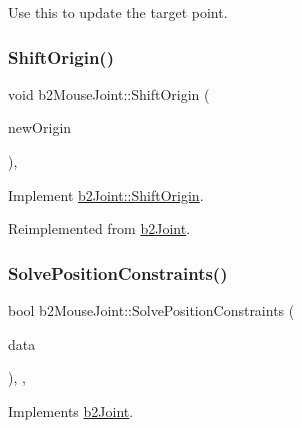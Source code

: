 Use this to update the target point. 

\mbox{\label{classb2_mouse_joint_a9b1b2671837495be175e496afb622904}} 
\subsubsection{\texorpdfstring{ShiftOrigin()}{ShiftOrigin()}}
{\footnotesize\ttfamily void b2\+Mouse\+Joint\+::\+Shift\+Origin (\begin{DoxyParamCaption}\item[{const \mbox{\hyperlink{structb2_vec2}{b2\+Vec2}} \&}]{new\+Origin }\end{DoxyParamCaption})\hspace{0.3cm}{\ttfamily [override]}, {\ttfamily [virtual]}}



Implement \mbox{\hyperlink{classb2_joint_a7804f649e993dc0fd9ae47fde5601f90}{b2\+Joint\+::\+Shift\+Origin}}. 



Reimplemented from \mbox{\hyperlink{classb2_joint_a7804f649e993dc0fd9ae47fde5601f90}{b2\+Joint}}.

\mbox{\label{classb2_mouse_joint_a13f9ec996eff59c15e6330a8c3f5ba9f}} 
\subsubsection{\texorpdfstring{SolvePositionConstraints()}{SolvePositionConstraints()}}
{\footnotesize\ttfamily bool b2\+Mouse\+Joint\+::\+Solve\+Position\+Constraints (\begin{DoxyParamCaption}\item[{const \mbox{\hyperlink{structb2_solver_data}{b2\+Solver\+Data}} \&}]{data }\end{DoxyParamCaption})\hspace{0.3cm}{\ttfamily [override]}, {\ttfamily [protected]}, {\ttfamily [virtual]}}



Implements \mbox{\hyperlink{classb2_joint_af767ac9aa494bd15cdf83dfe3e487d9c}{b2\+Joint}}.


